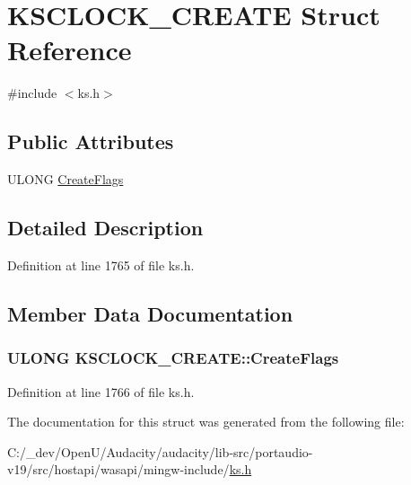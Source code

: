 \hypertarget{struct_k_s_c_l_o_c_k___c_r_e_a_t_e}{}\section{K\+S\+C\+L\+O\+C\+K\+\_\+\+C\+R\+E\+A\+TE Struct Reference}
\label{struct_k_s_c_l_o_c_k___c_r_e_a_t_e}


{\ttfamily \#include $<$ks.\+h$>$}

\subsection*{Public Attributes}
\begin{DoxyCompactItemize}
\item 
U\+L\+O\+NG \hyperlink{struct_k_s_c_l_o_c_k___c_r_e_a_t_e_a9538a723bd1b9e751525f8368120063e}{Create\+Flags}
\end{DoxyCompactItemize}


\subsection{Detailed Description}


Definition at line 1765 of file ks.\+h.



\subsection{Member Data Documentation}
\subsubsection[{\texorpdfstring{Create\+Flags}{CreateFlags}}]{\setlength{\rightskip}{0pt plus 5cm}U\+L\+O\+NG K\+S\+C\+L\+O\+C\+K\+\_\+\+C\+R\+E\+A\+T\+E\+::\+Create\+Flags}\hypertarget{struct_k_s_c_l_o_c_k___c_r_e_a_t_e_a9538a723bd1b9e751525f8368120063e}{}\label{struct_k_s_c_l_o_c_k___c_r_e_a_t_e_a9538a723bd1b9e751525f8368120063e}


Definition at line 1766 of file ks.\+h.



The documentation for this struct was generated from the following file\+:\begin{DoxyCompactItemize}
\item 
C\+:/\+\_\+dev/\+Open\+U/\+Audacity/audacity/lib-\/src/portaudio-\/v19/src/hostapi/wasapi/mingw-\/include/\hyperlink{ks_8h}{ks.\+h}\end{DoxyCompactItemize}

